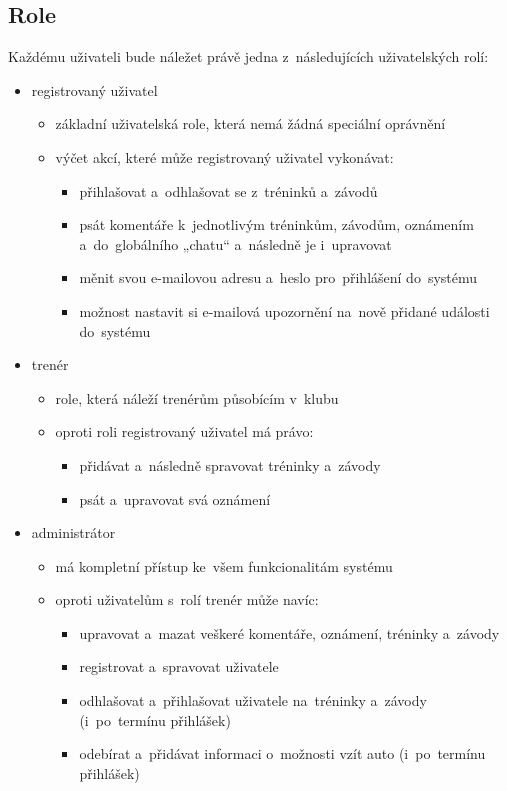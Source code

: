 \subsection{Role}
\label{section:role}
Každému uživateli bude náležet právě jedna z~následujících uživatelských rolí:
\begin{itemize}
	\item registrovaný uživatel
	\begin{itemize}
		\item základní uživatelská role, která nemá žádná speciální oprávnění
		\item výčet akcí, které může registrovaný uživatel vykonávat:
		\begin{itemize}
			\item přihlašovat a~odhlašovat se z~tréninků a~závodů
			\item psát komentáře k~jednotlivým tréninkům, závodům, oznámením a~do~globálního „chatu“ a~následně je i~upravovat
			\item měnit svou e-mailovou adresu a~heslo pro~přihlášení do~systému
			\item možnost nastavit si e-mailová upozornění na~nově přidané události do~systému
		\end{itemize}
	\end{itemize}
	\item trenér
	\begin{itemize}
		\item role, která náleží trenérům působícím v~klubu
		\item oproti roli registrovaný uživatel má právo:
		\begin{itemize}
			\item přidávat a~následně spravovat tréninky a~závody
			\item psát a~upravovat svá oznámení
		\end{itemize}
	\end{itemize}
	\item administrátor
	\begin{itemize}
		\item má kompletní přístup ke~všem funkcionalitám systému
		\item oproti uživatelům s~rolí trenér může navíc:
		\begin{itemize}
			\item upravovat a~mazat veškeré komentáře, oznámení, tréninky a~závody
			\item registrovat a~spravovat uživatele
			\item odhlašovat a~přihlašovat uživatele na~tréninky a~závody (i~po~termínu přihlášek)
			\item odebírat a~přidávat informaci o~možnosti vzít auto (i~po~termínu přihlášek)
		\end{itemize}
	\end{itemize}
\end{itemize}
